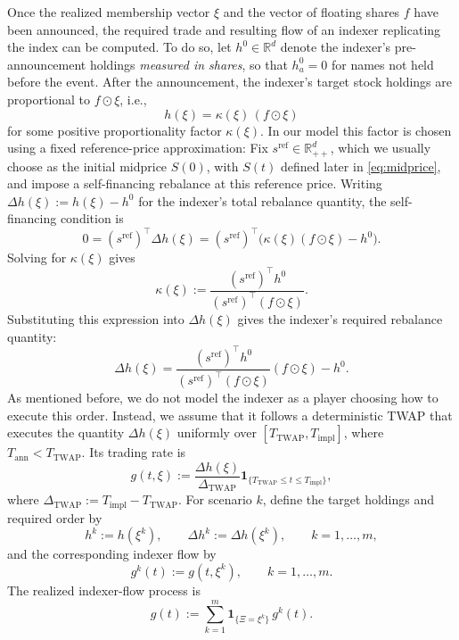\documentclass[12pt]{article}
\numberwithin{equation}{section}
\theoremstyle{definition}
\begin{document}
Once the realized membership vector \(\xi\) and the vector of floating shares \(f\) have been announced,
the required trade and resulting flow of an indexer replicating the
index can be computed. To do so, let
$h^0\in\mathbb{R}^d$ denote the indexer's pre-announcement holdings
\emph{measured in shares}, so that $h_a^0=0$ for names not held
before the event. After the announcement, the indexer's target stock holdings
are proportional to $f\odot \xi$, i.e.,
\begin{equation}\label{eq:target_holdings_proportional}
h(\xi)=\kappa(\xi)\,(f\odot \xi)
\end{equation}
for some positive proportionality factor $\kappa(\xi)$. In our model this factor is chosen using a
fixed reference-price approximation: Fix
\(s^{\mathrm{ref}}\in\mathbb{R}_{++}^d\), which we usually choose as the initial
midprice \(S(0)\), with \(S(t)\) defined later in \eqref{eq:midprice}, and impose a
self-financing rebalance at this reference price.
Writing \(\Delta h(\xi):=h(\xi)-h^0\) for the indexer's total
rebalance quantity, the self-financing condition is
\begin{equation}\label{eq:cash_neutral_condition}
0 = (s^{\mathrm{ref}})^\top \Delta h(\xi)
  = (s^{\mathrm{ref}})^\top\big(\kappa(\xi)(f\odot \xi)-h^0\big).
\end{equation}
Solving for $\kappa(\xi)$ gives
\begin{equation}
\kappa(\xi)
:=\frac{(s^{\mathrm{ref}})^\top h^0}
{(s^{\mathrm{ref}})^\top(f\odot \xi)}.
\label{eq:kappa_ref}
\end{equation}
Substituting this expression into \(\Delta h(\xi)\) gives the indexer's required
rebalance quantity:
\begin{equation}\label{eq:order_quantity}
\Delta h(\xi)
=\frac{(s^{\mathrm{ref}})^\top h^0}
{(s^{\mathrm{ref}})^\top(f\odot \xi)}(f\odot \xi)-h^0.
\end{equation}
As mentioned before,
we do not model the indexer as a player choosing how to execute this order.
Instead, we assume that it follows a deterministic TWAP that executes the
quantity \(\Delta h(\xi)\) uniformly over
\([T_{\mathrm{TWAP}},T_{\mathrm{impl}}]\), where
\(T_{\mathrm{ann}}<T_{\mathrm{TWAP}}\). Its trading rate is
\begin{equation}\label{eq:twap_rate}
g(t,\xi)
:=
\frac{\Delta h(\xi)}{\Delta_{\mathrm{TWAP}}}
\mathbf 1_{\{T_{\mathrm{TWAP}}\le t\le T_{\mathrm{impl}}\}},
\end{equation}
where \(\Delta_{\mathrm{TWAP}}:=T_{\mathrm{impl}}-T_{\mathrm{TWAP}}\).
For scenario \(k\), define the target holdings and required order by
\begin{equation}\label{eq:scenario_indexer_quantities}
h^k:=h(\xi^k),
\qquad
\Delta h^k:=\Delta h(\xi^k),
\qquad k=1,\dots,m,
\end{equation}
and the corresponding indexer flow by
\begin{equation}\label{eq:scenario_indexer_flows}
g^k(t):=g(t,\xi^k),
\qquad k=1,\dots,m.
\end{equation}
The realized indexer-flow process is
\begin{equation}\label{eq:realized_indexer_flow}
g(t)
:=
\sum_{k=1}^m
\mathbf 1_{\{\Xi=\xi^k\}}\,g^k(t).
\end{equation}
\end{document}
